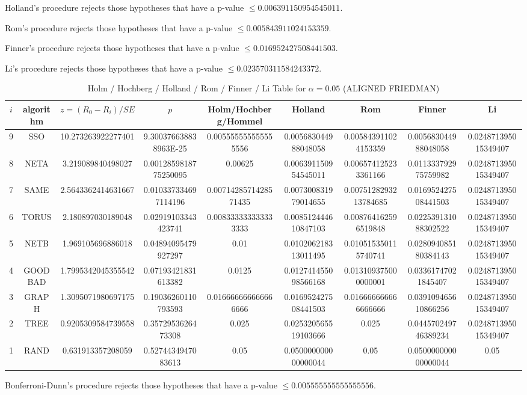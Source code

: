 \documentclass[a4paper,10pt]{article}
\begin{document}
\begin{landscape}
Holland's procedure rejects those hypotheses that have a p-value $\le0.006391150954545011$.


Rom's procedure rejects those hypotheses that have a p-value $\le0.005843911024153359$.


Finner's procedure rejects those hypotheses that have a p-value $\le0.016952427508441503$.


Li's procedure rejects those hypotheses that have a p-value $\le0.023570311584243372$.



\newpage

\begin{table}[!htp]
\centering\scriptsize
\caption{Holm / Hochberg / Holland / Rom / Finner / Li Table for $\alpha=0.05$ (ALIGNED FRIEDMAN)}
\begin{tabular}{ccccccccc}
$i$&algorithm&$z=(R_0 - R_i)/SE$&$p$&Holm/Hochberg/Hommel&Holland&Rom&Finner&Li\\
\hline
9& SSO&10.273263922277401&9.300376638838963E-25&0.005555555555555556&0.005683044988048058&0.005843911024153359&0.005683044988048058&0.024871395015349407\\
8& NETA&3.219089840498027&0.0012859818775250095&0.00625&0.006391150954545011&0.006574125233361166&0.011333792975759982&0.024871395015349407\\
7& SAME&2.5643362414631667&0.010337334697114196&0.0071428571428571435&0.007300831979014655&0.0075128293213784685&0.016952427508441503&0.024871395015349407\\
6& TORUS&2.180897030189048&0.02919103343423741&0.008333333333333333&0.008512444610847103&0.008764162596519848&0.022539131088302522&0.024871395015349407\\
5& NETB&1.969105696886018&0.04894095479927297&0.01&0.010206218313011495&0.010515350115740741&0.028094085180384143&0.024871395015349407\\
4& GOODBAD&1.7995342045355542&0.07193421831613382&0.0125&0.012741455098566168&0.013109375000000001&0.03361747021845407&0.024871395015349407\\
3& GRAPH&1.3095071980697175&0.19036260110793593&0.016666666666666666&0.016952427508441503&0.016666666666666666&0.039109465610866256&0.024871395015349407\\
2& TREE&0.9205309584739558&0.3572953626473308&0.025&0.025320565519103666&0.025&0.044570249746389234&0.024871395015349407\\
1& RAND&0.631913357208059&0.5274434947083613&0.05&0.050000000000000044&0.05&0.050000000000000044&0.05\\
\hline
\end{tabular}
\end{table}
Bonferroni-Dunn's procedure rejects those hypotheses that have a p-value $\le0.005555555555555556$.



\end{landscape}
\end{document}
